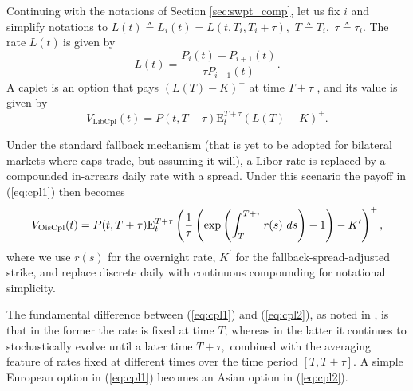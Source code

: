 \documentclass{article}
\begin{document}
Continuing with the notations of Section \ref{sec:swpt_comp}, let us fix $i$
and simplify notations to $L(t)\triangleq L_{i}(t)=L(t,T_{i},T_{i}+\tau ),$ $%
T\triangleq T_{i},$ $\tau \triangleq \tau _{i}$. The rate $L(t)\ $is given by%
\begin{equation*}
L(t)=\frac{P_{i}(t)-P_{i+1}(t)}{\tau P_{i+1}(t)}.
\end{equation*}%
A caplet is an option that pays $\left( L(T)-K\right) ^{+}$ at time $T+\tau $%
, and its value is given by%
\begin{equation}
V_{\mathrm{LibCpl}}(t)=P(t,T+\tau )\mathrm{E}_{t}^{T+\tau }\left(
L(T)-K\right) ^{+}.  \label{eq:cpl1}
\end{equation}

Under the standard fallback mechanism (that is yet to be adopted for
bilateral markets where caps trade, but assuming it will), a Libor rate is
replaced by a compounded in-arrears daily rate with a spread. Under this
scenario the payoff in (\ref{eq:cpl1}) then becomes%
\begin{equation}
V_{\mathrm{OisCpl}}(t)=P(t,T+\tau )\mathrm{E}_{t}^{T+\tau }\left( \frac{1}{%
\tau }\left( \exp \left( \int_{T}^{T+\tau }r(s)~ds\right) -1\right)
-K^{\prime }\right) ^{+},  \label{eq:cpl2}
\end{equation}%
where we use $r(s)$ for the overnight rate, $K^{\prime }$ for the
fallback-spread-adjusted strike, and replace discrete daily with continuous
compounding for notational simplicity.

The fundamental difference between (\ref{eq:cpl1}) and (\ref{eq:cpl2}), as
noted in \cite{henrard-ssrn1}, is that in the former the rate is fixed at
time $T$, whereas in the latter it continues to stochastically evolve until
a later time $T+\tau ,$ combined with the averaging feature of rates fixed
at different times over the time period $[T,T+\tau ].$ A simple European
option in (\ref{eq:cpl1}) becomes an Asian option in (\ref{eq:cpl2}).
\end{document}
